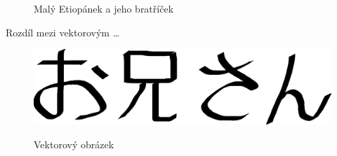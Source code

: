 \documentclass[a4paper, 11pt]{article}
\begin{document}
\begin{figure}[htb]
{ }
\caption{Malý Etiopánek a jeho bratříček}
\end{figure}
\newpage
Rozdíl mezi vektorovým \dots

\begin{figure}[htb]
\centering
\scalebox{0.4} { \includegraphics{oniisan.eps} }
\caption{Vektorový obrázek}
\end{figure}
\end{document}
